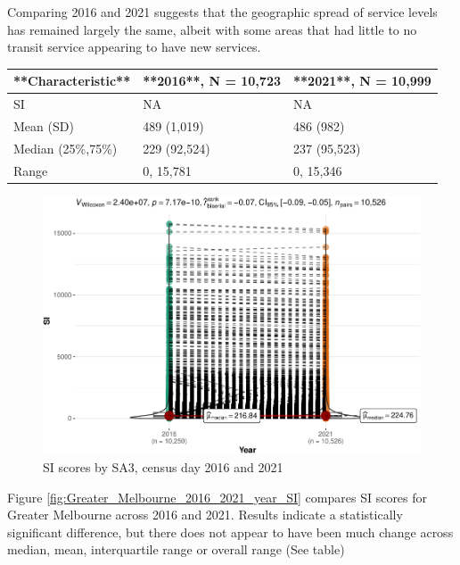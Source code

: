 \documentclass[preprint, 3p,
authoryear]{elsarticle} %
\begin{document}
Comparing 2016 and 2021 suggests that the geographic spread of service
levels has remained largely the same, albeit with some areas that had
little to no transit service appearing to have new services.

\begin{tabular}{l|l|l}
\hline
**Characteristic** & **2016**, N = 10,723 & **2021**, N = 10,999\\
\hline
SI & NA & NA\\
\hline
Mean (SD) & 489 (1,019) & 486 (982)\\
\hline
Median (25\%,75\%) & 229 (92,524) & 237 (95,523)\\
\hline
Range & 0, 15,781 & 0, 15,346\\
\hline
\end{tabular}

\begin{figure}
\centering
\includegraphics{Leveraging_GTFS_to_assess_transit_supply_Transport_Geography_files/figure-latex/Greater_Melbourne_2016_2021_year_SI-1.pdf}
\caption{SI scores by SA3, census day 2016 and 2021}
\end{figure}

Figure \ref{fig:Greater_Melbourne_2016_2021_year_SI} compares SI scores
for Greater Melbourne across 2016 and 2021. Results indicate a
statistically significant difference, but there does not appear to have
been much change across median, mean, interquartile range or overall
range (See table)
\end{document}

